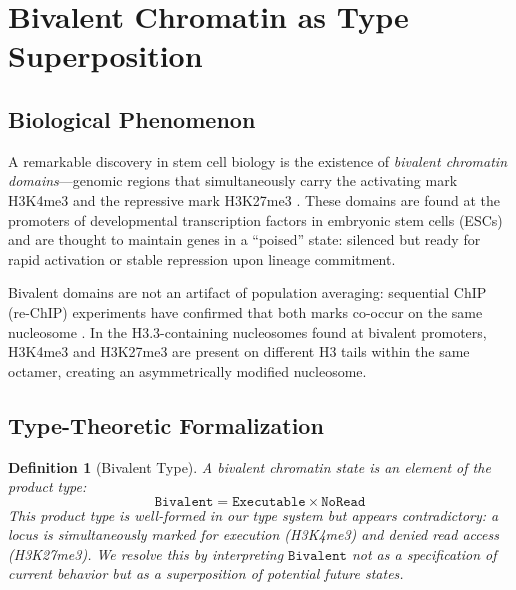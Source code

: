 \documentclass[12pt,a4paper]{article}
\newtheorem{definition}[theorem]{Definition}
\newcommand{\Biv}{\texttt{Bivalent}}
\begin{document}
\section{Bivalent Chromatin as Type Superposition}
\label{sec:bivalent}

\subsection{Biological Phenomenon}

A remarkable discovery in stem cell biology is the existence of \emph{bivalent chromatin domains}---genomic regions that simultaneously carry the activating mark H3K4me3 and the repressive mark H3K27me3 \cite{bernstein2006}. These domains are found at the promoters of developmental transcription factors in embryonic stem cells (ESCs) and are thought to maintain genes in a ``poised'' state: silenced but ready for rapid activation or stable repression upon lineage commitment.

Bivalent domains are not an artifact of population averaging: sequential ChIP (re-ChIP) experiments have confirmed that both marks co-occur on the same nucleosome \cite{voigt2013}. In the H3.3-containing nucleosomes found at bivalent promoters, H3K4me3 and H3K27me3 are present on different H3 tails within the same octamer, creating an asymmetrically modified nucleosome.

\subsection{Type-Theoretic Formalization}

\begin{definition}[Bivalent Type]
\label{def:bivalent}
A \emph{bivalent chromatin state} is an element of the product type:
\[
    \Biv = \texttt{Executable} \times \texttt{NoRead}
\]
This product type is well-formed in our type system but appears contradictory: a locus is simultaneously marked for execution (H3K4me3) and denied read access (H3K27me3). We resolve this by interpreting $\Biv$ not as a specification of current behavior but as a \emph{superposition} of potential future states.
\end{definition}
\end{document}
